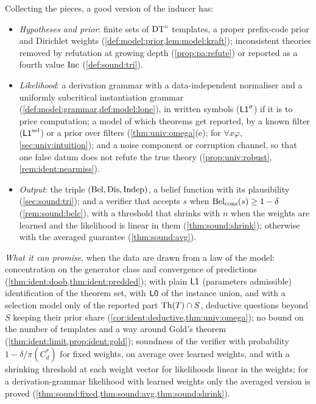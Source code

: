 Collecting the pieces, a good version of the inducer has:
\begin{itemize}[leftmargin=*,itemsep=1pt]
\item \emph{Hypotheses and prior}: finite sets of $\mathrm{DT}^{\circ}$ templates, a proper prefix-code prior and Dirichlet weights (\cref{def:model:prior,lem:model:kraft}); inconsistent theories removed by refutation at growing depth (\cref{prop:pa:refute}) or reported as a fourth value $\mathrm{Inc}$ (\cref{def:sound:tri}).
\item \emph{Likelihood}: a derivation grammar with a data-independent normaliser and a uniformly subcritical instantiation grammar (\cref{def:model:grammar,def:model:lone}), in written symbols ($\mathord{\mathsf{L1}}^{\sigma}$) if it is to price computation; a model of which theorems get reported, by a known filter ($\mathord{\mathsf{L1}}^{\mathrm{sel}}$) or a prior over filters (\cref{thm:univ:omega}(e); for $\forall x\varphi$, \cref{sec:univ:intuition}); and a noise component or corruption channel, so that one false datum does not refute the true theory (\cref{prop:univ:robust}, \cref{rem:ident:nearmiss}).
\item \emph{Output}: the triple $(\mathrm{Bel},\mathrm{Dis},\mathrm{Indep})$, a belief function with its plausibility (\cref{sec:sound:tri}); and a verifier that accepts $s$ when $\mathrm{Bel}_{\mathrm{cons}}(s)\ge1-\delta$ (\cref{rem:sound:belc}), with a threshold that shrinks with $n$ when the weights are learned and the likelihood is linear in them (\cref{thm:sound:shrink}); otherwise with the averaged guarantee (\cref{thm:sound:avg}).
\end{itemize}

\emph{What it can promise}, when the data are drawn from a law of the model: concentration on the generator class and convergence of predictions (\cref{thm:ident:doob,thm:ident:predded}); with plain $\mathord{\mathsf{L1}}$ (parameters admissible) identification of the theorem set, with $\mathord{\mathsf{L0}}$ of the instance union, and with a selection model only of the reported part $\mathrm{Th}(T)\cap S$, deductive questions beyond $S$ keeping their prior share (\cref{cor:ident:deductive,thm:univ:omega}); no bound on the number of templates and a way around Gold's theorem (\cref{thm:ident:limit,prop:ident:gold}); soundness of the verifier with probability $1-\delta/\pi(C^*_d)$ for fixed weights, on average over learned weights, and with a shrinking threshold at each weight vector for likelihoods linear in the weights; for a derivation-grammar likelihood with learned weights only the averaged version is proved (\cref{thm:sound:fixed,thm:sound:avg,thm:sound:shrink}).


